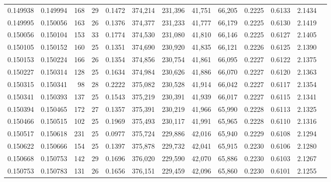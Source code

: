 \begin{tabular}{rrrrrrrrrrrrr}
0.149938 & 0.149994 & 168 &  29 &                                     0.1472 & 374,214 & 231,396 &  41,751 &  66,205 & 0.2225 & 0.6133 & 2.1434 \\
0.149995 & 0.150056 & 163 &  26 &                                     0.1376 & 374,377 & 231,233 &  41,777 &  66,179 & 0.2225 & 0.6130 & 2.1419 \\
0.150056 & 0.150104 & 153 &  33 &                                     0.1774 & 374,530 & 231,080 &  41,810 &  66,146 & 0.2225 & 0.6127 & 2.1405 \\
0.150105 & 0.150152 & 160 &  25 &                                     0.1351 & 374,690 & 230,920 &  41,835 &  66,121 & 0.2226 & 0.6125 & 2.1390 \\
0.150153 & 0.150224 & 166 &  26 &                                     0.1354 & 374,856 & 230,754 &  41,861 &  66,095 & 0.2227 & 0.6122 & 2.1375 \\
0.150227 & 0.150314 & 128 &  25 &                                     0.1634 & 374,984 & 230,626 &  41,886 &  66,070 & 0.2227 & 0.6120 & 2.1363 \\
0.150315 & 0.150341 &  98 &  28 &                                     0.2222 & 375,082 & 230,528 &  41,914 &  66,042 & 0.2227 & 0.6117 & 2.1354 \\
0.150341 & 0.150393 & 137 &  25 &                                     0.1543 & 375,219 & 230,391 &  41,939 &  66,017 & 0.2227 & 0.6115 & 2.1341 \\
0.150394 & 0.150465 & 172 &  27 &                                     0.1357 & 375,391 & 230,219 &  41,966 &  65,990 & 0.2228 & 0.6113 & 2.1325 \\
0.150466 & 0.150515 & 102 &  25 &                                     0.1969 & 375,493 & 230,117 &  41,991 &  65,965 & 0.2228 & 0.6110 & 2.1316 \\
0.150517 & 0.150618 & 231 &  25 &                                     0.0977 & 375,724 & 229,886 &  42,016 &  65,940 & 0.2229 & 0.6108 & 2.1294 \\
0.150622 & 0.150666 & 154 &  25 &                                     0.1397 & 375,878 & 229,732 &  42,041 &  65,915 & 0.2230 & 0.6106 & 2.1280 \\
0.150668 & 0.150753 & 142 &  29 &                                     0.1696 & 376,020 & 229,590 &  42,070 &  65,886 & 0.2230 & 0.6103 & 2.1267 \\
0.150753 & 0.150783 & 131 &  26 &                                     0.1656 & 376,151 & 229,459 &  42,096 &  65,860 & 0.2230 & 0.6101 & 2.1255 \\

\end{tabular}

